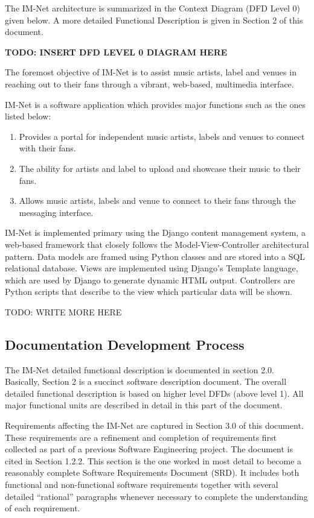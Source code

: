 \documentclass[letterpaper]{article}
\begin{document}
The IM-Net architecture is summarized in the Context Diagram (DFD Level 0) given below. A more detailed Functional Description is given in Section 2 of this document.

\textbf{TODO: INSERT DFD LEVEL 0 DIAGRAM HERE}

The foremost objective of IM-Net is to assist music artists, label and venues in reaching out to their fans through a vibrant, web-based, multimedia interface.

IM-Net is a software application which provides major functions such as the ones listed below:

\begin{enumerate}
\item  Provides a portal for independent music artists, labels and venues to connect with their fans.

\item  The ability for artists and label to upload and showcase their music to their fans.

\item  Allows music artists, labels and venue to connect to their fans through the messaging interface.
\end{enumerate}

IM-Net is implemented primary using the Django content management system, a web-based framework that closely follows the Model-View-Controller architectural pattern. Data models are framed using Python classes and are stored into a SQL relational database. Views are implemented using Django's Template language, which are used by Django to generate dynamic HTML output. Controllers are Python scripts that describe to the view which particular data will be shown. 

TODO: WRITE MORE HERE

\subsection{Documentation Development Process}

The IM-Net detailed functional description is documented in section 2.0. Basically, Section 2 is a succinct software description document. The overall detailed functional description is based on higher level DFDs (above level 1). All major functional units are described in detail in this part of the document.

Requirements affecting the IM-Net are captured in Section 3.0 of this document.  These requirements are a refinement and completion of requirements first collected as part of a previous Software Engineering project. The document is cited in Section 1.2.2. This section is the one worked in most detail to become a reasonably complete Software Requirements Document (SRD). It includes both functional and non-functional software requirements together with several detailed ``rational'' paragraphs whenever necessary to complete the understanding of each requirement.
\end{document}
